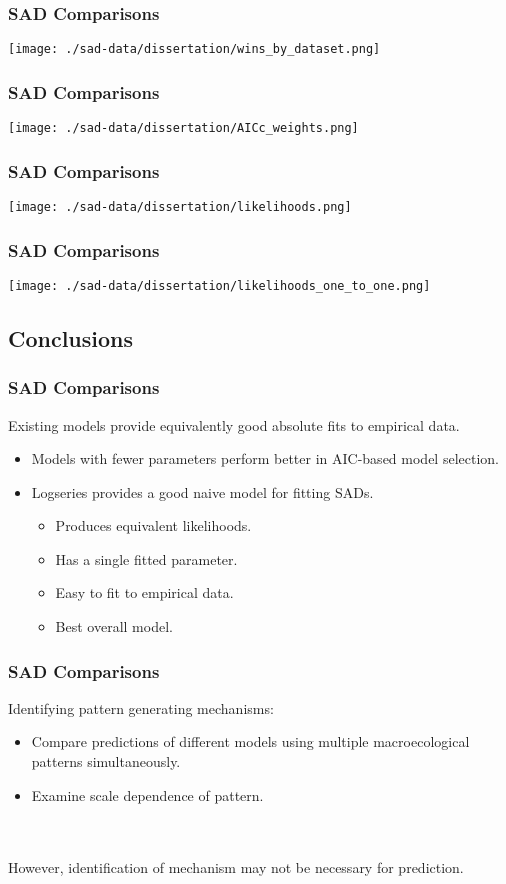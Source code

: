 \documentclass[14pt]{beamer}
\begin{document}
\begin{frame}{}
\frametitle{SAD Comparisons}
\texttt{[image: ./sad-data/dissertation/wins\_by\_dataset.png]}
\end{frame}

\begin{frame}{}
\frametitle{SAD Comparisons}
\texttt{[image: ./sad-data/dissertation/AICc\_weights.png]}
\end{frame}

\begin{frame}{}
\frametitle{SAD Comparisons}
\texttt{[image: ./sad-data/dissertation/likelihoods.png]}
\end{frame}

\begin{frame}{}
\frametitle{SAD Comparisons}
\texttt{[image: ./sad-data/dissertation/likelihoods\_one\_to\_one.png]}
\end{frame}

\subsection{Conclusions}
\begin{frame}
\frametitle{SAD Comparisons}
Existing models provide equivalently good absolute fits to empirical data.
\begin{itemize}
\item Models with fewer parameters perform better in AIC-based model selection.\\
\item Logseries provides a good naive model for fitting SADs.\\
\begin{itemize}
\item Produces equivalent likelihoods.
\item Has a single fitted parameter.
\item Easy to fit to empirical data.
\item Best overall model.
\end{itemize}
\end{itemize}
\end{frame}

\begin{frame}[t]
\frametitle{SAD Comparisons}
Identifying pattern generating mechanisms:
\begin{itemize}
\item Compare predictions of different models using multiple macroecological patterns simultaneously.\\
\item Examine scale dependence of pattern.
\end{itemize}
~\\
~\\
However, identification of mechanism may not be necessary for prediction.
\end{frame}
\end{document}
